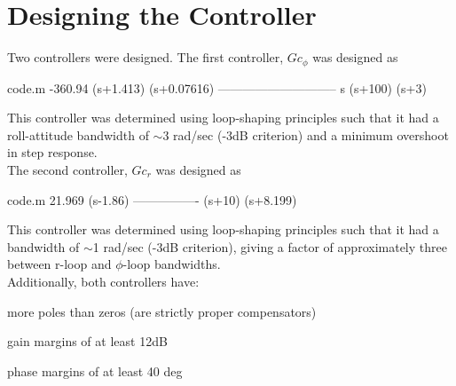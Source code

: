 \documentclass[12pt]{article}
\begin{document}
\clearpage
\section{Designing the Controller}
Two controllers were designed. The first controller, $Gc_{\phi}$ was designed as
\begin{filecontents*}{code.m}
  -360.94 (s+1.413) (s+0.07616)
  -----------------------------
         s (s+100) (s+3)
\end{filecontents*}


\noindent This controller was determined using loop-shaping principles such that it had a roll-attitude bandwidth of $\sim$3 rad/sec (-3dB criterion) and a minimum overshoot in step response. \\

\noindent The second controller, $Gc_r$ was designed as
\begin{filecontents*}{code.m}
  21.969 (s-1.86)
  ----------------
  (s+10) (s+8.199)
\end{filecontents*}


\noindent This controller was determined using loop-shaping principles such that it had a bandwidth of $\sim$1 rad/sec (-3dB criterion), giving a factor of approximately three between r-loop and $\phi$-loop bandwidths. \\

\noindent Additionally, both controllers have:

more poles than zeros (are strictly proper compensators)

gain margins of at least 12dB

phase margins of at least 40 deg

\clearpage
\end{document}

